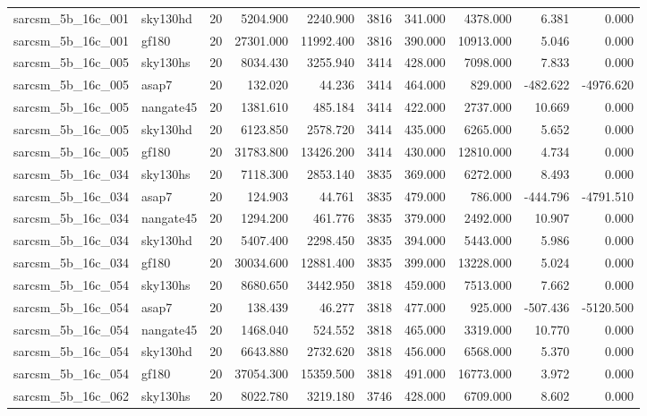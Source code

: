 \begin{longtable}{llrrrrrrrr}
sarcsm\_5b\_16c\_001 & sky130hd & 20 & 5204.900 & 2240.900 & 3816 & 341.000 & 4378.000 & 6.381 & 0.000 \\
sarcsm\_5b\_16c\_001 & gf180 & 20 & 27301.000 & 11992.400 & 3816 & 390.000 & 10913.000 & 5.046 & 0.000 \\
sarcsm\_5b\_16c\_005 & sky130hs & 20 & 8034.430 & 3255.940 & 3414 & 428.000 & 7098.000 & 7.833 & 0.000 \\
sarcsm\_5b\_16c\_005 & asap7 & 20 & 132.020 & 44.236 & 3414 & 464.000 & 829.000 & -482.622 & -4976.620 \\
sarcsm\_5b\_16c\_005 & nangate45 & 20 & 1381.610 & 485.184 & 3414 & 422.000 & 2737.000 & 10.669 & 0.000 \\
sarcsm\_5b\_16c\_005 & sky130hd & 20 & 6123.850 & 2578.720 & 3414 & 435.000 & 6265.000 & 5.652 & 0.000 \\
sarcsm\_5b\_16c\_005 & gf180 & 20 & 31783.800 & 13426.200 & 3414 & 430.000 & 12810.000 & 4.734 & 0.000 \\
sarcsm\_5b\_16c\_034 & sky130hs & 20 & 7118.300 & 2853.140 & 3835 & 369.000 & 6272.000 & 8.493 & 0.000 \\
sarcsm\_5b\_16c\_034 & asap7 & 20 & 124.903 & 44.761 & 3835 & 479.000 & 786.000 & -444.796 & -4791.510 \\
sarcsm\_5b\_16c\_034 & nangate45 & 20 & 1294.200 & 461.776 & 3835 & 379.000 & 2492.000 & 10.907 & 0.000 \\
sarcsm\_5b\_16c\_034 & sky130hd & 20 & 5407.400 & 2298.450 & 3835 & 394.000 & 5443.000 & 5.986 & 0.000 \\
sarcsm\_5b\_16c\_034 & gf180 & 20 & 30034.600 & 12881.400 & 3835 & 399.000 & 13228.000 & 5.024 & 0.000 \\
sarcsm\_5b\_16c\_054 & sky130hs & 20 & 8680.650 & 3442.950 & 3818 & 459.000 & 7513.000 & 7.662 & 0.000 \\
sarcsm\_5b\_16c\_054 & asap7 & 20 & 138.439 & 46.277 & 3818 & 477.000 & 925.000 & -507.436 & -5120.500 \\
sarcsm\_5b\_16c\_054 & nangate45 & 20 & 1468.040 & 524.552 & 3818 & 465.000 & 3319.000 & 10.770 & 0.000 \\
sarcsm\_5b\_16c\_054 & sky130hd & 20 & 6643.880 & 2732.620 & 3818 & 456.000 & 6568.000 & 5.370 & 0.000 \\
sarcsm\_5b\_16c\_054 & gf180 & 20 & 37054.300 & 15359.500 & 3818 & 491.000 & 16773.000 & 3.972 & 0.000 \\
sarcsm\_5b\_16c\_062 & sky130hs & 20 & 8022.780 & 3219.180 & 3746 & 428.000 & 6709.000 & 8.602 & 0.000 \\

\end{longtable}
